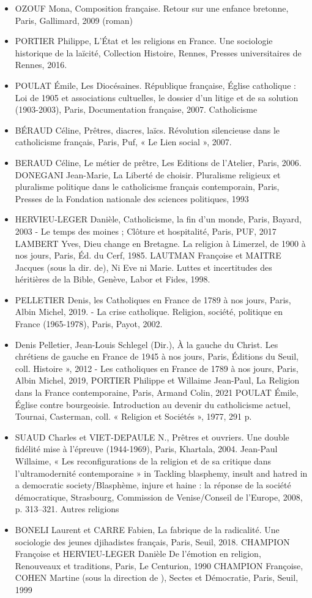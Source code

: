 \begin{itemize}
\item OZOUF Mona, Composition française. Retour sur une enfance bretonne, Paris,  Gallimard, 2009 (roman) 
\item PORTIER Philippe, L'État et les religions en France. Une sociologie historique de la  laïcité, Collection Histoire, Rennes, Presses universitaires de Rennes, 2016. 
\item POULAT Émile, Les Diocésaines. République française, Église catholique : Loi de  1905 et associations cultuelles, le dossier d'un litige et de sa solution (1903-2003), Paris, Documentation française, 2007.  Catholicisme  
\item BÉRAUD Céline, Prêtres, diacres, laïcs. Révolution silencieuse dans le catholicisme  français, Paris, Puf, « Le Lien social », 2007. 
\item BERAUD Céline, Le métier de prêtre, Les Editions de l’Atelier, Paris, 2006. DONEGANI Jean-Marie, La Liberté de choisir. Pluralisme religieux et pluralisme politique  dans le catholicisme français contemporain, Paris, Presses de la Fondation nationale des sciences politiques, 1993  
\item HERVIEU-LEGER Danièle, Catholicisme, la fin d’un monde, Paris, Bayard, 2003 - Le temps des moines ; Clôture et hospitalité, Paris, PUF, 2017 LAMBERT Yves, Dieu change en Bretagne. La religion à Limerzel, de 1900 à nos jours,  Paris, Éd. du Cerf, 1985. LAUTMAN Françoise et MAITRE Jacques (sous la dir. de), Ni Eve ni Marie. Luttes et  incertitudes des héritières de la Bible,  Genève, Labor et Fides, 1998. 
\item PELLETIER Denis, les Catholiques en France de 1789 à nos jours, Paris, Albin Michel, 2019. - La crise catholique. Religion, société, politique en France (1965-1978), Paris, Payot, 2002. 
\item  Denis Pelletier, Jean-Louis Schlegel (Dir.), À la gauche du Christ. Les chrétiens de gauche en France de 1945 à nos jours, Paris, Éditions du Seuil, coll.  Histoire », 2012 - Les catholiques en France de 1789 à nos jours, Paris, Albin Michel, 2019,  PORTIER Philippe et Willaime Jean-Paul, La Religion dans la France contemporaine,   Paris, Armand Colin, 2021 POULAT Émile, Église contre bourgeoisie. Introduction au devenir du catholicisme actuel,  Tournai, Casterman, coll. « Religion et Sociétés », 1977, 291 p. 
\item SUAUD Charles et VIET-DEPAULE N., Prêtres et ouvriers. Une double fidélité mise à  l’épreuve (1944-1969), Paris, Khartala, 2004. Jean-Paul Willaime, « Les reconfigurations de la religion et de sa critique dans l’ultramodernité contemporaine » in Tackling blasphemy, insult and hatred in a democratic society/Blasphème, injure et haine : la réponse de la société démocratique, Strasbourg, Commission de Venise/Conseil de l’Europe, 2008, p. 313–321. Autres religions  \item BONELI Laurent et CARRE Fabien, La fabrique de la radicalité. Une sociologie des jeunes  djihadistes français, Paris, Seuil, 2018. CHAMPION Françoise et HERVIEU-LEGER Danièle De l’émotion en religion,  Renouveaux et traditions, Paris, Le Centurion, 1990 CHAMPION Françoise, COHEN Martine (sous la direction de ), Sectes et Démocratie,  Paris, Seuil, 1999 

\end{itemize}
